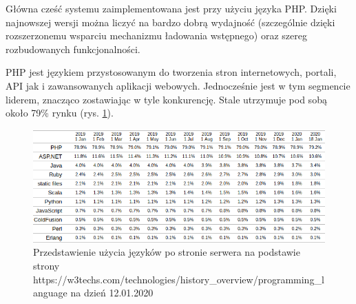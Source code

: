 Główna cześć systemu zaimplementowana jest przy użyciu języka PHP. Dzięki najnowszej wersji można liczyć na bardzo dobrą wydajność (szczególnie dzięki rozszerzonemu wsparciu mechanizmu ładowania wstępnego) oraz szereg rozbudowanych funkcjonalności. 

PHP jest językiem przystosowanym do tworzenia stron internetowych, portali, API jak i zawansowanych aplikacji webowych. Jednocześnie jest w tym segmencie liderem, znacząco zostawiając w tyle konkurencję. Stale utrzymuje pod sobą około 79\% rynku (rys. \ref{fig:php}).

\begin{figure}[!ht]
    \centering
    \includegraphics[width=6in]{images/php.png}
    \caption{Przedstawienie użycia języków po stronie serwera na podstawie strony https://w3techs.com/technologies/history\_overview/programming\_language na dzień 12.01.2020  \label{fig:php}}
\end{figure}